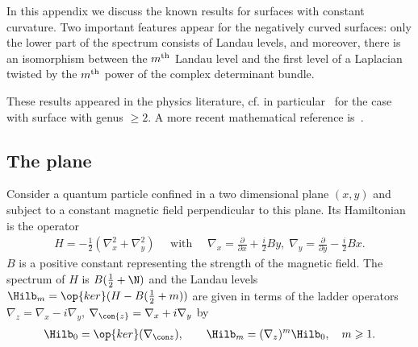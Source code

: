 In this appendix we discuss the known results for surfaces with constant curvature. Two important features appear for the negatively curved surfaces: only the lower part of the spectrum consists of Landau levels, and moreover, there is an isomorphism between the $m^{\rm th}$ Landau level and the first level of a Laplacian twisted by the $m^{\rm th}$ power of the complex determinant bundle.

These results appeared in the physics literature, cf. in particular~\cite{IeLi94} for the case with surface with genus $\geqslant 2$. A more recent mathematical reference is~\cite{Te06}.

\subsection*{The plane~\cite{La30}}
Consider a quantum particle confined in a two dimensional plane $(x,y)$ and subject to a constant magnetic field perpendicular to this plane. Its Hamiltonian is the operator
\begin{gather}\label{eq:laplacian_landau}
H = -\tfrac{1}{2} \left(\nabla_x^2 + \nabla_y^2\right) \quad \text{ with } \quad \nabla_x = \tfrac{\partial}{ \partial x} +
\tfrac{i}{2} B y,\; \nabla_y = \tfrac{\partial}{\partial y} - \tfrac{i}{2} Bx.
\end{gather}
$B$ is a positive constant representing the strength of the magnetic field. The spectrum of $H$ is $B(\frac{1}{2} + \N)$ and the Landau levels $\Hilb_m =
\op{ker} (H - B(\frac{1}{2} + m))$ are given in terms of the ladder operators $\nabla_z = \nabla_x - i \nabla_y$, $\nabla_{\con{z}} = \nabla_x + i
\nabla_y$ by
\begin{gather}\label{eq:landau_level}
\Hilb_0 = \op{ker} (\nabla_{\con z}), \qquad \Hilb_m = (\nabla_z)^m
\Hilb_0, \quad m \geqslant 1.
\end{gather}

